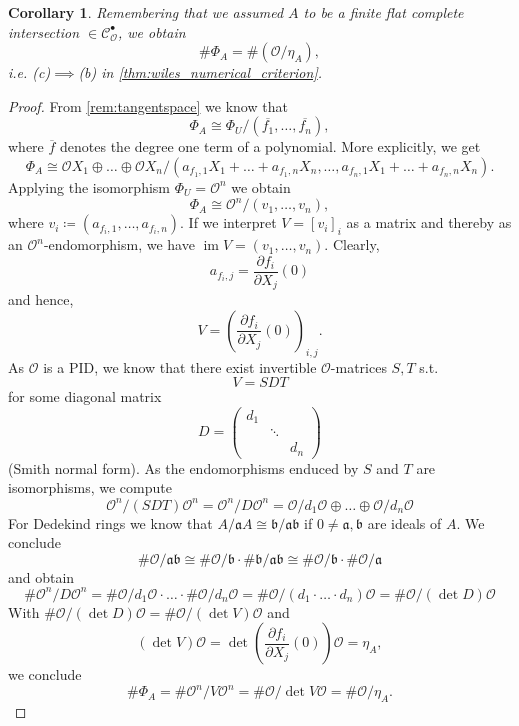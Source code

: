 \documentclass{article}
\theoremstyle{plain}%
\newtheorem{corollary}[theorem]{Corollary}
\theoremstyle{definition}
\theoremstyle{remark}
\newcommand{\cob}{\mathcal{C}_\mathcal{O}^\bullet}
\newcommand{\im}{\operatorname{im}}
\begin{document}
\begin{corollary}\textup{\cite[corollary 5.20]{Darmon1995}}\label{cor:cimpliesb}
    Remembering that we assumed \(A\) to be a finite flat complete intersection \(\in \cob\), we obtain
    \[
        \# \Phi_A = \# (\mathcal{O}/\eta_A),
    \]
    i.e. (c)\(\implies\)(b) in \cref{thm:wiles_numerical_criterion}.
\end{corollary}
\begin{proof}
    From \cref{rem:tangentspace} we know that 
    \[
        \Phi_A \cong \Phi_U/(\overline{f_1}, \dots, \overline{f_n}),  
    \]
    where \(\overline{f}\) denotes the degree one term of a polynomial. More explicitly, we get
    \[
        \Phi_A \cong \mathcal{O} X_1 \oplus \dots \oplus \mathcal{O} X_n/
        (a_{f_1, 1}X_1 + \dots + a_{f_1, n}X_n, \dots, a_{f_n, 1}X_1 + \dots + a_{f_n, n}X_n).  
    \]
    Applying the isomorphism \(\Phi_U = \mathcal{O}^n\) we obtain
    \[
        \Phi_A \cong \mathcal{O}^n/(v_1, \dots, v_n),
    \]
    where \(v_i \coloneqq (a_{f_i, 1}, \dots, a_{f_i, n})\).
    If we interpret \(V = [v_i]_i\) as a matrix and thereby as an \(\mathcal{O}^n\)-endomorphism, 
    we have \(\im V = (v_1, \dots, v_n)\).
    Clearly,
    \[
        a_{f_i, j} = \frac{\partial f_i}{\partial X_j}(0)  
    \]
    and hence,
    \[
        V = \left(\frac{\partial f_i}{\partial X_j}(0)\right)_{i, j}.
    \]
    As \(\mathcal{O}\) is a PID, we know that there exist invertible \(\mathcal{O}\)-matrices \(S,T\) s.t.
    \[
        V = SDT  
    \]
    for some diagonal matrix 
    \[
        D = \begin{pmatrix}
            d_1&&\\
            &\ddots&\\
            &&d_n
        \end{pmatrix}
    \]
    (Smith normal form).
    As the endomorphisms enduced by \(S\) and \(T\) are isomorphisms, we compute
    \[
        \mathcal{O}^n/(SDT)\mathcal{O}^n = \mathcal{O}^n/D\mathcal{O}^n = 
        \mathcal{O}/d_1\mathcal{O} \oplus \dots \oplus \mathcal{O}/d_n\mathcal{O}
    \]
    For Dedekind rings we know that \(A/\mathfrak{a}A \cong \mathfrak{b}/\mathfrak{a}\mathfrak{b}\)
    if \(0\neq \mathfrak{a},\mathfrak{b}\) are ideals of \(A\).
    We conclude
    \[
        \# \mathcal{O}/\mathfrak{a}\mathfrak{b} 
        \cong \#\mathcal{O}/\mathfrak{b} \cdot \# \mathfrak{b}/\mathfrak{a}\mathfrak{b} 
        \cong \#\mathcal{O}/\mathfrak{b} \cdot \#\mathcal{O}/\mathfrak{a}
    \]
    and obtain
    \[
        \# \mathcal{O}^n/D\mathcal{O}^n 
        = \# \mathcal{O}/d_1\mathcal{O} \cdot \dots \cdot \# \mathcal{O}/d_n\mathcal{O}
        = \# \mathcal{O}/(d_1\cdot \dots \cdot d_n)\mathcal{O} = \# \mathcal{O}/(\det D)\mathcal{O}
    \]
    With \(\# \mathcal{O}/(\det D)\mathcal{O} = \# \mathcal{O}/(\det V)\mathcal{O}\)
    and
    \[
        (\det V) \mathcal{O} = \det (\frac{\partial f_i}{\partial X_j}(0)) \mathcal{O} = \eta_A,
    \]
    we conclude
    \[
        \# \Phi_A = \# \mathcal{O}^n/V\mathcal{O}^n =  \# \mathcal{O}/\det V\mathcal{O} = \# \mathcal{O}/\eta_A.
    \]
\end{proof}
\end{document}
